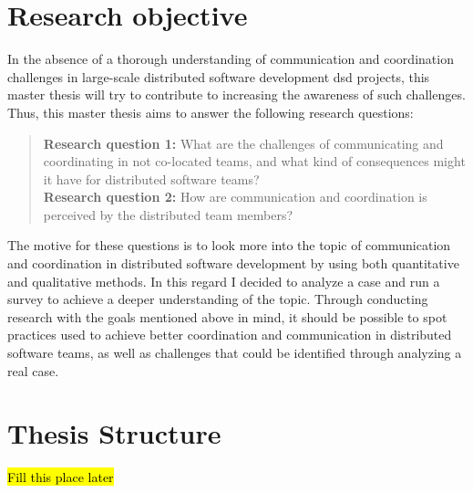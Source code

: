 \section{Research objective}
In the absence of a thorough understanding of communication and coordination challenges in large-scale distributed software development \ac{dsd} projects, this master thesis will try to contribute to increasing the awareness of such challenges. Thus, this master thesis aims to answer the following research questions:

\begin{quote}
\textbf{Research question 1:} What are the challenges of communicating and coordinating in not co-located teams, and what kind of consequences might it have for distributed software teams?\\
\textbf{Research question 2:} How are communication and coordination is perceived by the distributed team members?
\end{quote}

The motive for these questions is to look more into the topic of communication and coordination in distributed software development by using both quantitative and qualitative methods. In this regard I decided to analyze a case and run a survey to achieve a deeper understanding of the topic. Through conducting research with the goals mentioned above in mind, it should be possible to spot practices used to achieve better coordination and communication in distributed software teams, as well as challenges that could be identified through analyzing a real case. 


\section{Thesis Structure}
\hl{Fill this place later}



